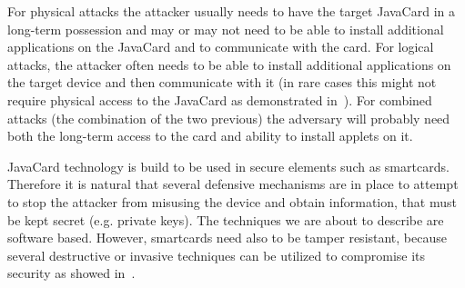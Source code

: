 \documentclass{../llncs/llncs}
\begin{document}
        For physical attacks the attacker usually needs to have the target JavaCard in a long-term possession and may or may not need to be able to install additional applications on the JavaCard and to communicate with the card. For logical attacks, the attacker often needs to be able to install additional applications on the target device and then communicate with it (in rare cases this might not require physical access to the JavaCard as demonstrated in~\cite{se:gemalto:part2}). For combined attacks (the combination of the two previous) the adversary will probably need both the long-term access to the card and ability to install applets on it.

        JavaCard technology is build to be used in secure elements such as smartcards. Therefore it is natural that several defensive mechanisms are in place to attempt to stop the attacker from misusing the device and obtain information, that must be kept secret (e.g. private keys).
The techniques we are about to describe are software based. However, smartcards need also to be tamper resistant, because several destructive or invasive techniques can be utilized to compromise its security as showed in~\cite{kommerling}.

\end{document}
